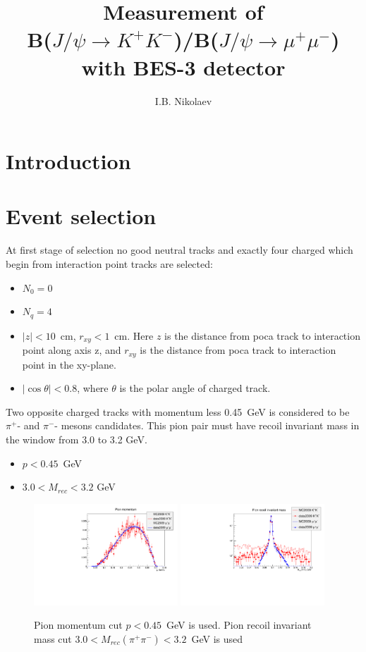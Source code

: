 \documentclass[a4paper,12pt]{article}
\title{Measurement of \\B($J/\psi \to K^+K^-$)/B($J/\psi \to \mu^+\mu^-$) \\
with BES-3 detector}
\author{I.B. Nikolaev}
\newcommand{\pipi}{\pi^{+}\pi^{-}}
\begin{document}
\maketitle

\section{Introduction}

\section{Event selection}

At first stage of selection no good neutral tracks and exactly four  charged which begin from interaction point tracks are selected:
\begin{itemize}
  \item $N_0 = 0$
	\item $N_q = 4$
	\item $|z| <  10$~cm,  $r_{xy} < 1$~cm. Here $z$ is the distance from poca track to interaction point along axis z, 
		and $r_{xy}$ is the distance from poca track to interaction point in the xy-plane.
	\item $|\cos{\theta}|<0.8$, where $\theta$ is the polar angle of charged track.
\end{itemize}


Two opposite charged tracks with momentum less 0.45~GeV is considered to be
$\pi^+$- and $\pi^-$- mesons candidates. This pion pair must have recoil
invariant mass in the window from 3.0 to 3.2 GeV.
\begin{itemize}
	\item $p<0.45$~GeV
	\item $3.0 < M_{rec} < 3.2$ GeV
\end{itemize}

\begin{figure}
\begin{center}
  \includegraphics[width=0.48\textwidth]{fig/pion_momentum.pdf} \hfill
  \includegraphics[width=0.48\textwidth]{fig/pion_Mrec.pdf}
  \caption{Pion momentum cut \mbox{$p<0.45$~GeV} is used. Pion recoil invariant mass cut $3.0 < M_{rec}(\pipi) < 3.2$~GeV is used}
\end{center}
\end{figure}
\end{document}
